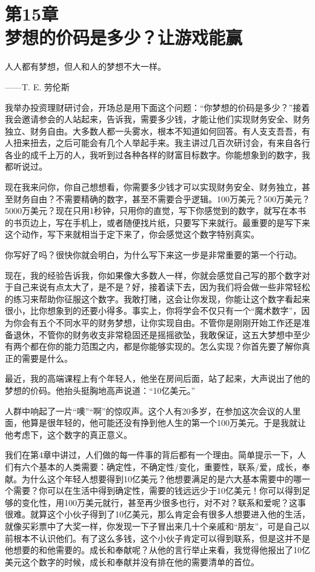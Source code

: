 
\section[第15章\q 梦想的价码是多少？让游戏能赢]{第15章\\ 梦想的价码是多少？让游戏能赢}

\begin{BookQuote}
人人都有梦想，但人和人的梦想不大一样。

\hfill ——T. E. 劳伦斯
\end{BookQuote}

我举办投资理财研讨会，开场总是用下面这个问题：“你梦想的价码是多少？”接着我会邀请参会的人站起来，告诉我，需要多少钱，才能让他们实现财务安全、财务独立、财务自由。大多数人都一头雾水，根本不知道如何回答。有人支支吾吾，有人扭来扭去，之后可能会有几个人举起手来。我主讲过几百次研讨会，有来自各行各业的成千上万的人，我听到过各种各样的财富目标数字。你能想象到的数字，我都听说过。

现在我来问你，你自己想想看，你需要多少钱才可以实现财务安全、财务独立，甚至财务自由？不需要精确的数字，甚至不需要合乎逻辑。100万美元？500万美元？5000万美元？现在只用1秒钟，只用你的直觉，写下你感觉到的数字，就写在本书的书页边上，写在手机上，或者随便找片纸，只要写下来就行。最重要的是写下来这个动作，写下来就相当于定下来了，你会感觉这个数字特别真实。

你写好了吗？很快你就会明白，为什么写下来这一步是非常重要的第一个行动。

现在，我的经验告诉我，你如果像大多数人一样，你就会感觉自己写的那个数字对于自己来说有点太大了，是不是？好，接着读下去，因为我们将会做一些非常轻松的练习来帮助你征服这个数字。我敢打赌，这会让你发现，你能让这个数字看起来很小，比你想象到的还要小得多。事实上，你将学会不仅只有一个“魔术数字”，因为你会有五个不同水平的财务梦想，让你实现自由。不管你是刚刚开始工作还是准备退休，不管你的财务收支非常稳固还是摇摇欲坠，我敢保证，这五大梦想中至少有两个都在你的能力范围之内，都是你能够实现的。怎么实现？你首先要了解你真正的需要是什么。

最近，我的高端课程上有个年轻人，他坐在房间后面，站了起来，大声说出了他的梦想的价码。他抬头挺胸地高声说道：“10亿美元。”

人群中响起了一片“噢”“啊”的惊叹声。这个人有20多岁，在参加这次会议的人里面，他算是很年轻的，他可能还没有挣到他人生的第一个100万美元。于是我就让他考虑下，这个数字的真正意义。

我们在第4章中讲过，人们做的每一件事的背后都有一个理由。简单提示一下，人们有六个基本的人类需要：确定性，不确定性/变化，重要性，联系/爱，成长，奉献。为什么这个年轻人想要得到10亿美元？他想要满足的是六大基本需要中的哪一个需要？你可以在生活中得到确定性，需要的钱远远少于10亿美元！你可以得到足够的变化性，用100万美元就行，甚至再少很多也行，对不对？联系和爱呢？这事很难。就算这个小伙子得到了10亿美元，那么肯定会有很多人想要进入他的生活，就像买彩票中了大奖一样，你发现一下子冒出来几十个亲戚和“朋友”，可是自己以前根本不认识他们。有了这么多钱，这个小伙子肯定可以得到联系，但是这并不是他想要的和他需要的。成长和奉献呢？从他的言行举止来看，我觉得他报出了10亿美元这个数字的时候，成长和奉献并没有排在他的需要清单的首位。

